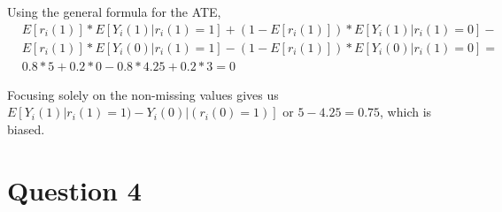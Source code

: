 \documentclass[11pt,notitlepage]{article}\usepackage[]{graphicx}\usepackage[]{color}
\makeatletter
\newenvironment{kframe}{%
 \def\at@end@of@kframe{}%
 \ifinner\ifhmode%
  \def\at@end@of@kframe{\end{minipage}}%
  \begin{minipage}{\columnwidth}%
 \fi\fi%
 \def\FrameCommand##1{\hskip\@totalleftmargin \hskip-\fboxsep
 \colorbox{shadecolor}{##1}\hskip-\fboxsep
     \hskip-\linewidth \hskip-\@totalleftmargin \hskip\columnwidth}%
 \MakeFramed {\advance\hsize-\width
   \@totalleftmargin\z@ \linewidth\hsize
   \@setminipage}}%
 {\par\unskip\endMakeFramed%
 \at@end@of@kframe}
\newenvironment{knitrout}{}{} %
\makeatother
\begin{document}
Using the general formula for the ATE,
\begin{align*}
& E[r_i(1)] * E[Y_i(1)|r_i(1)=1] + (1-E[r_i(1)])*E[Y_i(1)|r_i(1)=0] - \\
& E[r_i(1)] * E[Y_i(0)|r_i(1)=1]-(1-E[r_i(1)])*E[Y_i(0)|r_i(1)=0] =\\
& 0.8 * 5 + 0.2 * 0 - 0.8*4.25 + 0.2*3 = 0
\end{align*}

Focusing solely on the non-missing values gives us $E[Y_i(1)|r_i(1)=1)-Y_i(0)|(r_i (0)=1)]$ or $5 - 4.25 = 0.75$, which is biased.

\section*{Question 4}
\begin{knitrout}
\color{fgcolor}\begin{kframe}
\begin{verbatim}





\end{verbatim}
\end{kframe}
\end{knitrout}
\end{document}
